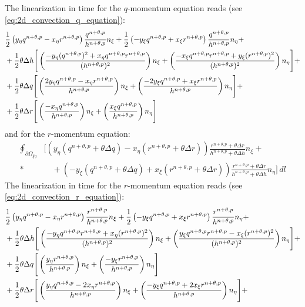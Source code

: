 The linearization in time for the $q$-momentum equation reads (see \autoref{eq:2d_convection_q_equation}):
%
\begin{align}
& \frac{1}{2} \left( y_\eta q^{n+\theta, p} - x_\eta r^{n+\theta, p} \right)
\frac{q^{n+\theta, p}}{h^{n+\theta, p}} n_{\xi}
+ \frac{1}{2} \left(-y_\xi q^{n+\theta, p} +
x_\xi r^{n+\theta, p} \right) \frac{q^{n+\theta, p}}{h^{n+\theta, p}} n_\eta +
\\
& + \frac{1}{2} \theta \Delta h \Bigg[
\left( \frac{- y_\eta (q^{n+\theta, p})^2 + x_\eta {q^{n+\theta, p} r^{n+\theta, p}}}{(h^{n+\theta, p})^2} \right) n_\xi+
\left( \frac{- x_\xi q^{n+\theta, p}r^{n+\theta, p} + y_\xi (r^{n+\theta, p})^2}{(h^{n+\theta, p})^2} \right) n_\eta
\Bigg]+
\\
& + \frac{1}{2} \theta \Delta q \Bigg[
\left( \frac{   2y_\eta q^{n+\theta, p} - x_\eta r^{n+\theta, p}}{h^{n+\theta, p}} \right) n_\xi +
\left( \frac{ - 2y_\xi  q^{n+\theta, p} + x_\xi  r^{n+\theta, p}}{h^{n+\theta, p}} \right) n_\eta
\Bigg] +
\\
& + \frac{1}{2} \theta \Delta r \Bigg[
 \left( \frac{ - x_\eta q^{n+\theta, p}}{h^{n+\theta, p}} \right) n_\xi +
 \left( \frac{   x_\xi  q^{n+\theta, p}}{h^{n+\theta, p}} \right) n_\eta
\Bigg]
\end{align}
and for the $r$-momentum equation:
%
\begin{align}
    \oint_{\partial\Omega_{\xi\eta}} & \Bigg[ \left( y_{\eta}\left(q^{n+\theta, p} + \theta \Delta q\right) - x_{\eta} \left(r^{n+\theta, p} + \theta \Delta r\right) \right) \frac{r^{n+\theta, p} + \theta \Delta r}{h^{n+\theta, p} + \theta \Delta h}  n_\xi +
    \nonumber \\*
    &\quad + \left( -y_{\xi}\left(q^{n+\theta, p} + \theta \Delta q\right)  + x_{\xi}\left(r^{n+\theta, p} + \theta \Delta r\right)\right) \frac{r^{n+\theta, p} + \theta \Delta r}{h^{n+\theta, p} + \theta \Delta h} n_\eta \Bigg] \, dl
\end{align}
The linearization in time for the $r$-momentum equation reads (see \autoref{eq:2d_convection_r_equation}):
\begin{align}
& \frac{1}{2} \left( y_\eta q^{n+\theta, p} - x_\eta r^{n+\theta, p} \right)
\frac{r^{n+\theta, p}}{h^{n+\theta, p}} n_{\xi}
+ \frac{1}{2} \left(-y_\xi q^{n+\theta, p} +
x_\xi r^{n+\theta, p} \right) \frac{r^{n+\theta, p}}{h^{n+\theta, p}} n_\eta +
\\
& + \frac{1}{2} \theta \Delta h \Bigg[
\left( \frac{- y_\eta q^{n+\theta, p} r^{n+\theta, p} + x_\eta (r^{n+\theta, p})^2}{(h^{n+\theta, p})^2}
\right) n_\xi +
\left( \frac{y_\xi q^{n+\theta, p}r^{n+\theta, p} - x_\xi  (r^{n+\theta, p})^2}{(h^{n+\theta, p})^2}
\right) n_\eta
\Bigg] +
\\
& + \frac{1}{2} \theta \Delta q \Bigg[
\left( \frac{   y_\eta r^{n+\theta, p}}{h^{n+\theta, p}} \right) n_\xi +
\left( \frac{ - y_\xi  r^{n+\theta, p}}{h^{n+\theta, p}} \right) n_\eta
\Bigg]
\\
& + \frac{1}{2} \theta \Delta r \Bigg[
\left( \frac{  y_\eta q^{n+\theta, p} - 2 x_\eta r^{n+\theta, p}}{h^{n+\theta, p}} \right) n_\xi+
\left( \frac{- y_\xi  q^{n+\theta, p} + 2 x_\xi  r^{n+\theta, p}}{h^{n+\theta, p}} \right) n_\eta
\Bigg] +
\end{align}

